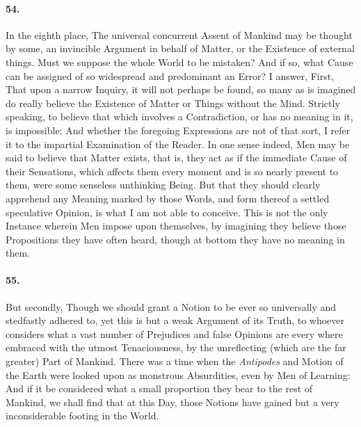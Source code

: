 \documentclass[]{article}
\newenvironment{sectionbody}{}{}
\begin{document}
\begin{sectionbody}
\paragraph{54.} In the eighth place, The universal concurrent Assent of Mankind
may be thought by some, an invincible Argument in behalf of
Matter, or the Existence of external things.  Must we suppose the
whole World to be mistaken? And if so, what Cause can be assigned
of so widespread and predominant an Error? I answer, First, That
upon a narrow Inquiry, it will not perhaps be found, so many as
is imagined do really believe the Existence of Matter or Things
without the Mind.  Strictly speaking, to believe that which
involves a Contradiction, or has no meaning in it, is impossible:
And whether the foregoing Expressions are not of that sort, I
refer it to the impartial Examination of the Reader.  In one
sense indeed, Men may be said to believe that Matter exists, that
is, they act as if the immediate Cause of their Sensations, which
affects them every moment and is so nearly present to them, were
some senseless unthinking Being.  But that they should clearly
apprehend any Meaning marked by those Words, and form thereof a
settled speculative Opinion, is what I am not able to conceive.
This is not the only Instance wherein Men impose upon themselves,
by imagining they believe those Propositions they have often
heard, though at bottom they have no meaning in them.



\paragraph{55.} But secondly, Though we should grant a Notion to be ever so
universally and stedfastly adhered to, yet this is but a weak
Argument of its Truth, to whoever considers what a vast number of
Prejudices and false Opinions are every where embraced with the
utmost Tenaciousness, by the unreflecting (which are the far
greater) Part of Mankind.  There was a time when the
\emph{Antipodes} and Motion of the Earth were looked upon as
monstrous Absurdities, even by Men of Learning: And if it be
considered what a small proportion they bear to the rest of
Mankind, we shall find that at this Day, those Notions have
gained but a very inconsiderable footing in the World.




\end{sectionbody}
\end{document}
